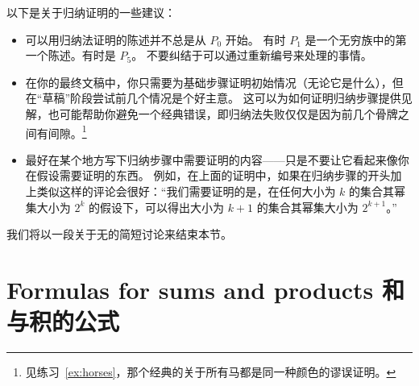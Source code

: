 以下是关于归纳证明的一些建议：

\begin{itemize}
\item 
可以用归纳法证明的陈述并不总是从 $P_0$ 开始。
有时 $P_1$ 是一个无穷族中的第一个陈述。有时是 $P_5$。
不要纠结于可以通过重新编号来处理的事情。

\item 
在你的最终文稿中，你只需要为基础步骤证明初始情况（无论它是什么），但在“草稿”阶段尝试前几个情况是个好主意。
这可以为如何证明归纳步骤提供见解，也可能帮助你避免一个经典错误，即归纳法失败仅仅是因为前几个骨牌之间有间隙。\footnote{见练习~\ref{ex:horses}，那个经典的关于所有马都是同一种颜色的谬误证明。}

\item 
最好在某个地方写下归纳步骤中需要证明的内容——只是不要让它看起来像你在假设需要证明的东西。
例如，在上面的证明中，如果在归纳步骤的开头加上类似这样的评论会很好：“我们需要证明的是，在任何大小为 $k$ 的集合其幂集大小为 $2^k$ 的假设下，可以得出大小为 $k+1$ 的集合其幂集大小为 $2^{k+1}$。”
\end{itemize}
\medskip

我们将以一段关于无的简短讨论来结束本节。


\newpage

  



 
\newpage

\section{Formulas for sums and products 和与积的公式}
\label{sec:sums_prods}

